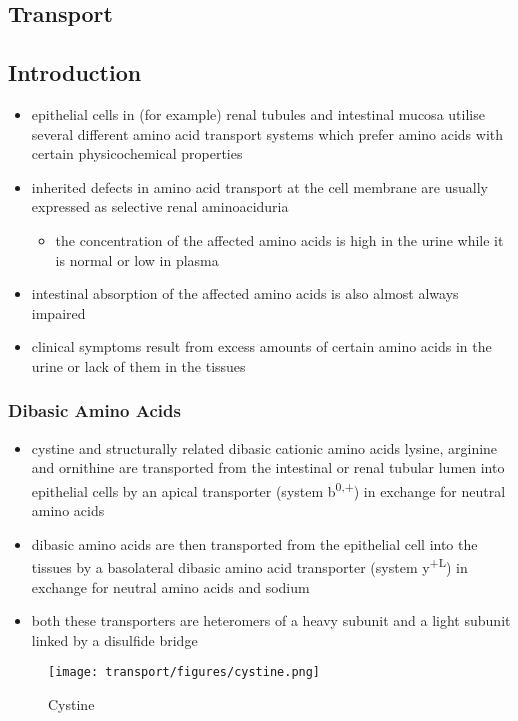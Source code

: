 \documentclass[12pt]{scrartcl}
\begin{document}
\begin{center}
\begin{center}
\section{Transport}
\label{sec:org6b4f05e}
\subsection{Introduction}
\label{sec:org6b12a55}
\begin{itemize}
\item epithelial cells in (for example) renal tubules and intestinal
mucosa utilise several different amino acid transport systems which
prefer amino acids with certain physicochemical properties
\item inherited defects in amino acid transport at the cell membrane are
usually expressed as selective renal aminoaciduria
\begin{itemize}
\item the concentration of the affected amino acids is high in the urine
while it is normal or low in plasma
\end{itemize}
\item intestinal absorption of the affected amino acids is also almost
always impaired
\item clinical symptoms result from excess amounts of certain amino acids
in the urine or lack of them in the tissues
\end{itemize}
\subsubsection{Dibasic Amino Acids}
\label{sec:orgc0b66ad}
\begin{itemize}
\item cystine and structurally related dibasic cationic amino acids
lysine, arginine and ornithine are transported from the intestinal
or renal tubular lumen into epithelial cells by an apical
transporter (system b\textsuperscript{0,+}) in exchange for neutral amino acids
\item dibasic amino acids are then transported from the epithelial cell
into the tissues by a basolateral dibasic amino acid transporter
(system y\textsuperscript{+L}) in exchange for neutral amino acids and sodium
\item both these transporters are heteromers of a heavy subunit and a
light subunit linked by a disulfide bridge
\end{itemize}

\begin{figure}[htbp]
\centering
\texttt{[image: transport/figures/cystine.png]}
\caption{\label{fig:orgfaec43d}Cystine}
\end{figure}


\end{center}
\end{center}
\end{document}
